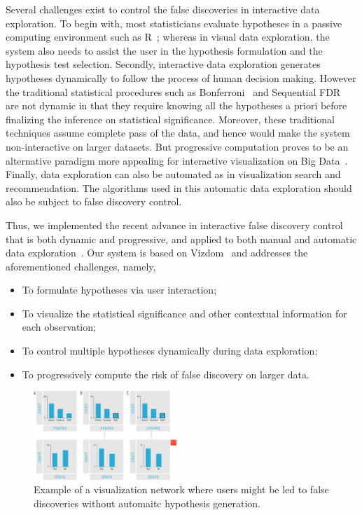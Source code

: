 Several challenges exist to control the false discoveries in interactive data exploration.  To begin with, most statisticians evaluate hypotheses in a passive computing environment such as R~\cite{R}; whereas in visual data exploration, the system also needs to assist the user in the hypothesis formulation and the hypothesis test selection. Secondly, interactive data exploration generates hypotheses dynamically to follow the process of human decision making.  However the traditional statistical procedures such as Bonferroni~\cite{bonferroni1936teoria} and Sequential FDR~\cite{g2016sequential} are not dynamic in that they require knowing all the hypotheses a priori before finalizing the inference on statistical significance.  Moreover, these traditional techniques assume complete pass of the data, and hence would make the system non-interactive on larger datasets.  But progressive computation proves to be an alternative paradigm more appealing for interactive visualization on Big Data~\cite{zgraggen2016progressive, onlineagg, vizdom}.  Finally, data exploration can also be automated as in visualization search and recommendation. The algorithms used in this automatic data exploration should also be subject to false discovery control.

Thus, we implemented the recent advance in interactive false discovery control that is both dynamic and progressive, and applied to both manual and automatic data exploration~\cite{zhao2016controlling}. Our system \system{} is based on Vizdom~\cite{vizdom} and addresses the aforementioned challenges, namely,
\begin{itemize}
    \item To formulate hypotheses via user interaction;
    \item To visualize the statistical significance and other contextual information for each observation;
    \item To control multiple hypotheses dynamically during data exploration;
    \item To progressively compute the risk of false discovery on larger data.
\end{itemize}

\begin{figure}
\centering
\includegraphics[width=0.48\textwidth]{figures/example}
\caption{Example of a visualization network where users might be led to false discoveries without automaitc hypothesis generation. }
\label{fig:example}	
\end{figure}